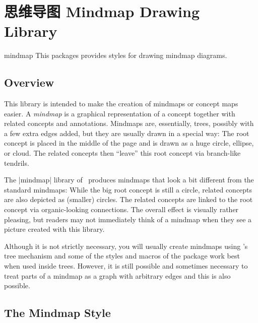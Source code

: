 %
%
%


\section{思维导图 Mindmap Drawing Library}

\begin{tikzlibrary}{mindmap}
    This packages provides styles for drawing mindmap diagrams.
\end{tikzlibrary}


\subsection{Overview}

This library is intended to make the creation of mindmaps or concept maps
easier. A \emph{mindmap} is a graphical representation of a concept together
with related concepts and annotations. Mindmaps are, essentially, trees,
possibly with a few extra edges added, but they are usually drawn in a special
way: The root concept is placed in the middle of the page and is drawn as a
huge circle, ellipse, or cloud. The related concepts then ``leave'' this root
concept via branch-like tendrils.

The |mindmap| library of \tikzname\ produces mindmaps that look a bit different
from the standard mindmaps: While the big root concept is still a circle,
related concepts are also depicted as (smaller) circles. The related concepts
are linked to the root concept via organic-looking connections. The overall
effect is visually rather pleasing, but readers may not immediately think of a
mindmap when they see a picture created with this library.

Although it is not strictly necessary, you will usually create mindmaps using
\tikzname's tree mechanism and some of the styles and macros of the package
work best when used inside trees. However, it is still possible and sometimes
necessary to treat parts of a mindmap as a graph with arbitrary edges and this
is also possible.


\subsection{The Mindmap Style}

